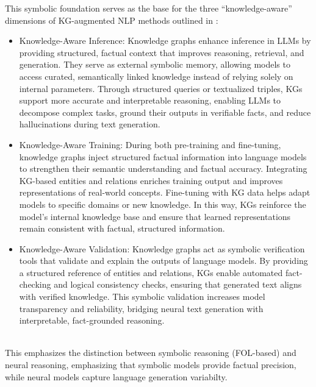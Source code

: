\documentclass[conference]{IEEEtran}
\begin{document}
\noindent
This symbolic foundation serves as the base for the three “knowledge-aware” dimensions of KG-augmented NLP methods outlined in \cite{agrawal2024kg_hallucinations}:
\begin{itemize}
    \item Knowledge-Aware Inference: Knowledge graphs enhance inference in LLMs by providing structured, factual context that improves reasoning, retrieval, and generation. They serve as external symbolic memory, allowing models to access curated, semantically linked knowledge instead of relying solely on internal parameters. Through structured queries or textualized triples, KGs support more accurate and interpretable reasoning, enabling LLMs to decompose complex tasks, ground their outputs in verifiable facts, and reduce hallucinations during text generation.

    \item Knowledge-Aware Training: During both pre-training and fine-tuning, knowledge graphs inject structured factual information into language models to strengthen their semantic understanding and factual accuracy. Integrating KG-based entities and relations enriches training output and improves representations of real-world concepts. Fine-tuning with KG data helps adapt models to specific domains or new knowledge. In this way, KGs reinforce the model’s internal knowledge base and ensure that learned representations remain consistent with factual, structured information.
    
    \item Knowledge-Aware Validation: Knowledge graphs act as symbolic verification tools that validate and explain the outputs of language models. By providing a structured reference of entities and relations, KGs enable automated fact-checking and logical consistency checks, ensuring that generated text aligns with verified knowledge. This symbolic validation increases model transparency and reliability, bridging neural text generation with interpretable, fact-grounded reasoning.
\end{itemize}
    
    
\noindent
\\
This emphasizes the distinction between symbolic reasoning (FOL-based) \cite{KL2025slides} and neural reasoning, emphasizing that symbolic models provide factual precision, while neural models capture language generation variabilty.




 
\end{document}
